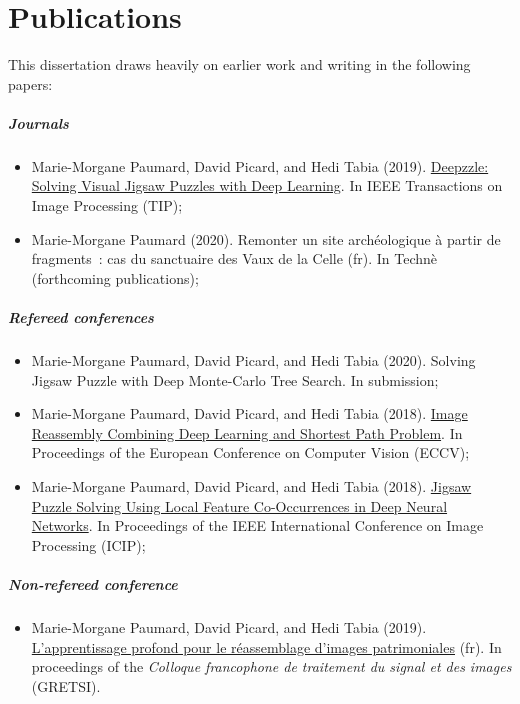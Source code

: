 \chapter*{Publications}

This dissertation draws heavily on earlier work and writing in the following papers:


\paragraph{Journals}
\begin{itemize}
    \item \citep{paumard2020deepzzle} Marie-Morgane Paumard, David Picard, and Hedi Tabia (2019). \href{https://hal.archives-ouvertes.fr/hal-02494602v1}{Deepzzle: Solving Visual Jigsaw Puzzles with Deep Learning}. In IEEE Transactions on Image Processing (TIP);
    \item Marie-Morgane Paumard (2020). Remonter un site archéologique à partir de fragments~: cas du sanctuaire des Vaux de la Celle (fr). In Technè (forthcoming publications);
\end{itemize}


\paragraph{Refereed conferences}
\begin{itemize}
    \item Marie-Morgane Paumard, David Picard, and Hedi Tabia (2020). Solving Jigsaw Puzzle with Deep Monte-Carlo Tree Search. In submission;
    \item \citep{paumard2018image} Marie-Morgane Paumard, David Picard, and Hedi Tabia (2018). \href{https://hal.archives-ouvertes.fr/hal-01869765v2}{Image Reassembly Combining Deep Learning and Shortest Path Problem}. In Proceedings of the European Conference on Computer Vision (ECCV);
    \item \citep{paumard2018jigsaw} Marie-Morgane Paumard, David Picard, and Hedi Tabia (2018). \href{https://hal.archives-ouvertes.fr/hal-01820489v2}{Jigsaw Puzzle Solving Using Local Feature Co-Occurrences in Deep Neural Networks}. In Proceedings of the IEEE International Conference on Image Processing (ICIP);
\end{itemize}


\paragraph{Non-refereed conference}
\begin{itemize}
    \item Marie-Morgane Paumard, David Picard, and Hedi Tabia (2019). \href{https://hal.archives-ouvertes.fr/hal-02466564v1}{L’apprentissage profond pour le réassemblage d’images patrimoniales} (fr). In proceedings of the \textit{Colloque francophone de traitement du signal et des images} (GRETSI).
\end{itemize}